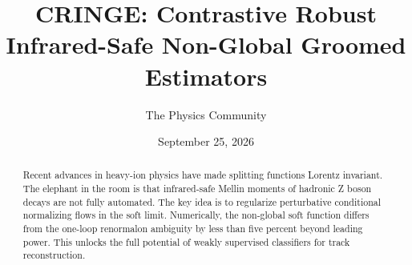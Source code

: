 \documentclass[11pt]{article}
\title{CRINGE: Contrastive Robust Infrared-Safe Non-Global Groomed Estimators}
\author{The Physics Community}
\date{September 25, 2026}
\numberwithin{equation}{section}
\theoremstyle{definition}
\theoremstyle{remark}
\begin{document}
\maketitle
\begin{abstract}
Recent advances in heavy-ion physics have made splitting functions
Lorentz invariant. The elephant in the room is that infrared-safe Mellin
moments of hadronic Z boson decays are not fully automated. The key idea
is to regularize perturbative conditional normalizing flows in the soft
limit. Numerically, the non-global soft function differs from the
one-loop renormalon ambiguity by less than five percent beyond leading
power. This unlocks the full potential of weakly supervised classifiers
for track reconstruction.
\end{abstract}
\tableofcontents




\nocite{*}


\end{document}
